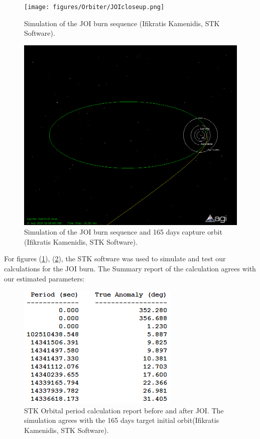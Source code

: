 \begin{figure}[htb!]
\centering
\texttt{[image: figures/Orbiter/JOIcloseup.png]}
\caption{Simulation of the JOI burn sequence (Ifikratis Kamenidis, STK Software).}
\label{fig:joicloseup}
\end{figure}

\begin{figure}[htb!]
\centering
\includegraphics[scale=0.4]{figures/Orbiter/JOIfull.png}
\caption{Simulation of the JOI burn sequence and 165 days capture orbit (Ifikratis Kamenidis, STK Software).}
\label{fig:joifull}
\end{figure}

For figures (\ref{fig:joicloseup}), (\ref{fig:joifull}), the STK software was used to simulate and test our calculations for the JOI burn. The Summary report of the calculation agrees with our estimated parameters:

\begin{figure}[htb!]
\centering
\includegraphics[scale=0.5]{figures/Orbiter/captorb.png}
\caption{STK Orbital period calculation report before and after JOI. The simulation agrees with the 165 days target initial orbit(Ifikratis Kamenidis, STK Software).}
\end{figure}

